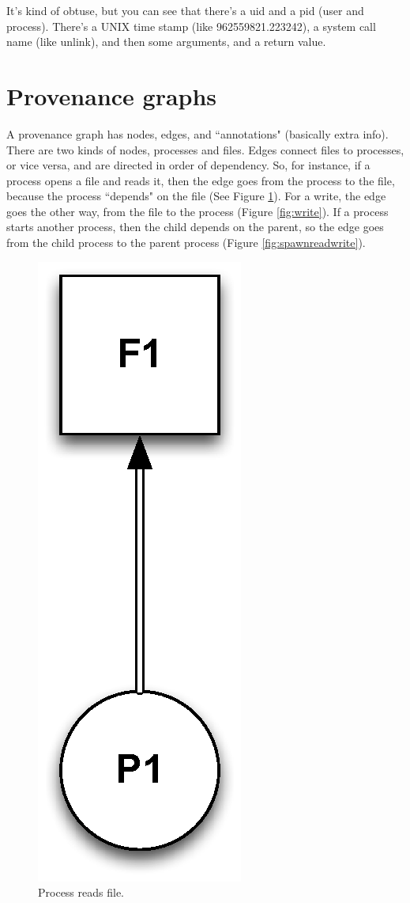 \documentclass{article}
\begin{document}
It's kind of obtuse, but you can see that there's a uid and a pid (user and process). There's a UNIX time stamp (like 962559821.223242), a system call name (like unlink), and then some arguments, and a return value.
\section{Provenance graphs}
A provenance graph has nodes, edges, and ``annotations" (basically extra info). There are two kinds of nodes, processes and files. Edges connect files to processes, or vice versa, and are directed in order of dependency. So, for instance, if a process opens a file and reads it, then the edge goes from the process to the file, because the process ``depends" on the file (See Figure \ref {fig:read}). For a write, the edge goes the other way, from the file to the process (Figure \ref{fig:write}). If a process starts another process, then the child depends on the parent, so the edge goes from the child process to the parent process (Figure \ref{fig:spawnreadwrite}).

%

%

\begin{figure}[h!]
  \centering
    \includegraphics[width=.25\textwidth]{figs/readfile}
      \caption{Process reads file.}
      \label{fig:read}
\end{figure}
\end{document}
